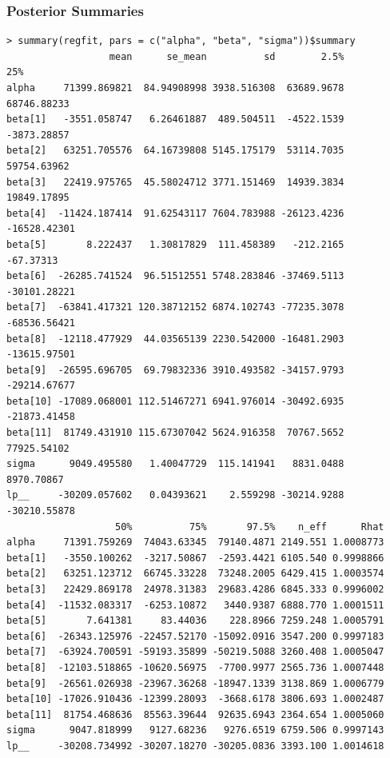 \documentclass[xcolor=dvipsnames]{beamer}
\begin{document}
\begin{frame}[fragile]
\frametitle{Posterior Summaries}
\tiny{
\begin{verbatim}
> summary(regfit, pars = c("alpha", "beta", "sigma"))$summary
                  mean      se_mean          sd        2.5%          25%
alpha     71399.869821  84.94908998 3938.516308  63689.9678  68746.88233
beta[1]   -3551.058747   6.26461887  489.504511  -4522.1539  -3873.28857
beta[2]   63251.705576  64.16739808 5145.175179  53114.7035  59754.63962
beta[3]   22419.975765  45.58024712 3771.151469  14939.3834  19849.17895
beta[4]  -11424.187414  91.62543117 7604.783988 -26123.4236 -16528.42301
beta[5]       8.222437   1.30817829  111.458389   -212.2165    -67.37313
beta[6]  -26285.741524  96.51512551 5748.283846 -37469.5113 -30101.28221
beta[7]  -63841.417321 120.38712152 6874.102743 -77235.3078 -68536.56421
beta[8]  -12118.477929  44.03565139 2230.542000 -16481.2903 -13615.97501
beta[9]  -26595.696705  69.79832336 3910.493582 -34157.9793 -29214.67677
beta[10] -17089.068001 112.51467271 6941.976014 -30492.6935 -21873.41458
beta[11]  81749.431910 115.67307042 5624.916358  70767.5652  77925.54102
sigma      9049.495580   1.40047729  115.141941   8831.0488   8970.70867
lp__     -30209.057602   0.04393621    2.559298 -30214.9288 -30210.55878
                   50%          75%       97.5%    n_eff      Rhat
alpha     71391.759269  74043.63345  79140.4871 2149.551 1.0008773
beta[1]   -3550.100262  -3217.50867  -2593.4421 6105.540 0.9998866
beta[2]   63251.123712  66745.33228  73248.2005 6429.415 1.0003574
beta[3]   22429.869178  24978.31383  29683.4286 6845.333 0.9996002
beta[4]  -11532.083317  -6253.10872   3440.9387 6888.770 1.0001511
beta[5]       7.641381     83.44036    228.8966 7259.248 1.0005791
beta[6]  -26343.125976 -22457.52170 -15092.0916 3547.200 0.9997183
beta[7]  -63924.700591 -59193.35899 -50219.5088 3260.408 1.0005047
beta[8]  -12103.518865 -10620.56975  -7700.9977 2565.736 1.0007448
beta[9]  -26561.026938 -23967.36268 -18947.1339 3138.869 1.0006779
beta[10] -17026.910436 -12399.28093  -3668.6178 3806.693 1.0002487
beta[11]  81754.468636  85563.39644  92635.6943 2364.654 1.0005060
sigma      9047.818999   9127.68236   9276.6519 6759.506 0.9997143
lp__     -30208.734992 -30207.18270 -30205.0836 3393.100 1.0014618
\end{verbatim}
}
\end{frame}
\end{document}

